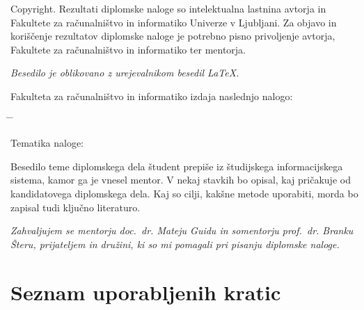 \documentclass[a4paper, 12pt]{book}
\newcommand{\clearemptydoublepage}{\newpage{\pagestyle{empty}\cleardoublepage}}
\begin{document}
\noindent
{\sc Copyright}. 
Rezultati diplomske naloge so intelektualna lastnina avtorja in Fakultete za računalništvo in informatiko Univerze v Ljubljani.
Za objavo in koriščenje rezultatov diplomske naloge je potrebno pisno privoljenje avtorja, Fakultete za računalništvo in informatiko ter mentorja.

\begin{center}
\mbox{}\vfill
\emph{Besedilo je oblikovano z urejevalnikom besedil \LaTeX.}
\end{center}
\clearemptydoublepage

\thispagestyle{empty}
\vspace*{4cm}

\noindent
Fakulteta za računalništvo in informatiko izdaja naslednjo nalogo:
\medskip
\begin{tabbing}
\hspace{32mm}\= \hspace{6cm} \= \kill




Tematika naloge:
\end{tabbing}
Besedilo teme diplomskega dela študent prepiše iz študijskega informacijskega sistema, kamor ga je vnesel mentor. V nekaj stavkih bo opisal, kaj pričakuje od kandidatovega diplomskega dela. Kaj so cilji, kakšne metode uporabiti, morda bo zapisal tudi ključno literaturo.
\vspace{15mm}






\vspace{2cm}

\clearemptydoublepage

\thispagestyle{empty}\mbox{}\vfill\null\it%
\noindent
Zahvaljujem se mentorju doc.\ dr. Mateju Guidu in somentorju prof.\ dr. Branku Šteru, prijateljem in družini, ki so mi pomagali pri pisanju diplomske naloge.
\rm\normalfont

\clearemptydoublepage


\pagestyle{empty}
\def\thepage{}%
\tableofcontents{}


\clearemptydoublepage


\chapter*{Seznam uporabljenih kratic}  %
\end{document}
